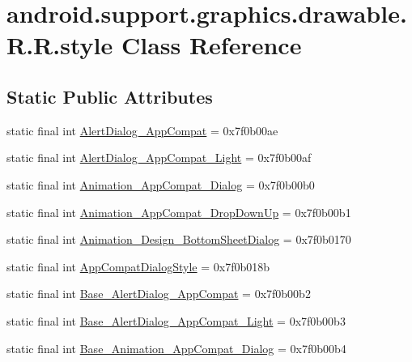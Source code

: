 \hypertarget{classandroid_1_1support_1_1graphics_1_1drawable_1_1_r_1_1style}{
\section{android.support.graphics.drawable.R.R.style Class Reference}
\label{classandroid_1_1support_1_1graphics_1_1drawable_1_1_r_1_1style}
}
\subsection*{Static Public Attributes}
\begin{CompactItemize}
\item 
static final int \hyperlink{classandroid_1_1support_1_1graphics_1_1drawable_1_1_r_1_1style_19e7e4006208d1b4ffb92fc493d15e39}{AlertDialog\_\-AppCompat} = 0x7f0b00ae
\item 
static final int \hyperlink{classandroid_1_1support_1_1graphics_1_1drawable_1_1_r_1_1style_c2f8c07751565f10c1747e2b712d8715}{AlertDialog\_\-AppCompat\_\-Light} = 0x7f0b00af
\item 
static final int \hyperlink{classandroid_1_1support_1_1graphics_1_1drawable_1_1_r_1_1style_46e1fc85a193764d60ed6426e8e6d527}{Animation\_\-AppCompat\_\-Dialog} = 0x7f0b00b0
\item 
static final int \hyperlink{classandroid_1_1support_1_1graphics_1_1drawable_1_1_r_1_1style_f0bbabcecf1caba6cd8df0959de68983}{Animation\_\-AppCompat\_\-DropDownUp} = 0x7f0b00b1
\item 
static final int \hyperlink{classandroid_1_1support_1_1graphics_1_1drawable_1_1_r_1_1style_02942b785a6ae7ee2fdb84cc88a20950}{Animation\_\-Design\_\-BottomSheetDialog} = 0x7f0b0170
\item 
static final int \hyperlink{classandroid_1_1support_1_1graphics_1_1drawable_1_1_r_1_1style_d4d960f184c49f078ac71df9e5c2071c}{AppCompatDialogStyle} = 0x7f0b018b
\item 
static final int \hyperlink{classandroid_1_1support_1_1graphics_1_1drawable_1_1_r_1_1style_a7ca7140322f2584f86084dd6dd9d80e}{Base\_\-AlertDialog\_\-AppCompat} = 0x7f0b00b2
\item 
static final int \hyperlink{classandroid_1_1support_1_1graphics_1_1drawable_1_1_r_1_1style_c3b8cca925bb04c92486d8abfa68700e}{Base\_\-AlertDialog\_\-AppCompat\_\-Light} = 0x7f0b00b3
\item 
static final int \hyperlink{classandroid_1_1support_1_1graphics_1_1drawable_1_1_r_1_1style_2672d0bdea344a0945ffbda11da27c35}{Base\_\-Animation\_\-AppCompat\_\-Dialog} = 0x7f0b00b4

\end{CompactItemize}
